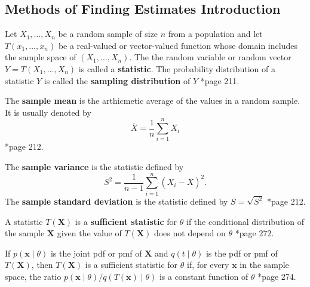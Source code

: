 \subsection*{Methods of Finding Estimates Introduction}

\begin{defe}[Statistic] \label{defe: statistic}
    Let $X_1, \ldots , X_n$ be a random sample of size $n$ from a population and let $T(x_1, \ldots , x_n)$ be a real-valued or vector-valued function whose domain includes the sample space of $(X_1, \ldots , X_n)$. The the random variable or random vector $Y = T(X_1, \ldots , X_n)$ is called a {\bf statistic}. The probability distribution of a statistic $Y$ is called the {\bf sampling distribution} of $Y$ \cite{CasellaGeorge2001SI}*{page 211}.
\end{defe}

\begin{defe} \label{defe: sample_mean}
    The {\bf sample mean} is the arthicmetic average of the values in a random sample. It is usually denoted by
    \begin{equation}
        \overline{X} = \frac{1}{n} \sum_{i=1}^{n} X_i
    \end{equation}
    \cite{CasellaGeorge2001SI}*{page 212}.
\end{defe}

\begin{defe} \label{defe: var_std_dev}
    The {\bf sample variance} is the statistic defined by
    \begin{equation}
        S^2 = \frac{1}{n-1} \sum_{i=1}^{n} (X_i - \overline{X})^2.
    \end{equation}
    The {\bf sample standard deviation} is the statistic defined by $S = \sqrt{S^2}$ \cite{CasellaGeorge2001SI}*{page 212}.
\end{defe}

\begin{defe} \label{defe: sufficient_statistic}
    A statistic $T(\bm{X})$ is a {\bf sufficient statistic} for $\theta$ if the conditional distribution of the sample $\bm{X}$ given the value of $T(\bm{X})$ does not depend on $\theta$ \cite{CasellaGeorge2001SI}*{page 272}.
\end{defe}

\begin{thm} \label{thm: sufficient_statistic_ratio}
    If $p(\bm{x} \mid \theta)$ is the joint pdf or pmf of $\bm{X}$ and $q(t \mid \theta)$ is the pdf or pmf of $T(\bm{X})$, then $T(\bm{X})$ is a sufficient statistic for $\theta$ if, for every $\bm{x}$ in the sample space, the ratio $p(\bm{x} \mid \theta) / q(T(\bm{x}) \mid \theta)$ is a constant function of $\theta$ \cite{CasellaGeorge2001SI}*{page 274}.
\end{thm}

